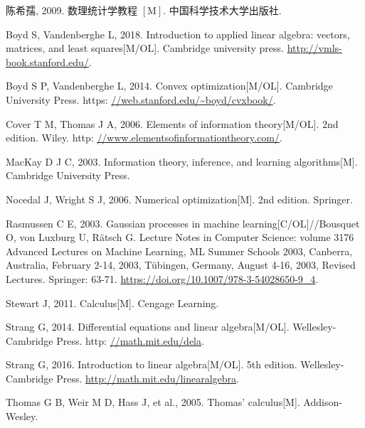 \documentclass[10pt]{article}
\begin{document}
陈希孺, 2009. 数理统计学教程 $[\mathrm{M}]$. 中国科学技术大学出版社.

Boyd S, Vandenberghe L, 2018. Introduction to applied linear algebra: vectors, matrices, and least squares[M/OL]. Cambridge university press. \href{http://vmls-book.stanford.edu/}{http://vmls-book.stanford.edu/}.

Boyd S P, Vandenberghe L, 2014. Convex optimization[M/OL]. Cambridge University Press. https: \href{//web.stanford.edu/%7Eboyd/cvxbook/}{//web.stanford.edu/\~{}boyd/cvxbook/}.

Cover T M, Thomas J A, 2006. Elements of information theory[M/OL]. 2nd edition. Wiley. http: \href{//www.elementsofinformationtheory.com/}{//www.elementsofinformationtheory.com/}.

MacKay D J C, 2003. Information theory, inference, and learning algorithms[M]. Cambridge University Press.

Nocedal J, Wright S J, 2006. Numerical optimization[M]. 2nd edition. Springer.

Rasmussen C E, 2003. Gaussian processes in machine learning[C/OL]//Bousquet O, von Luxburg U, Rätsch G. Lecture Notes in Computer Science: volume 3176 Advanced Lectures on Machine Learning, ML Summer Schools 2003, Canberra, Australia, February 2-14, 2003, Tübingen, Germany, August 4-16, 2003, Revised Lectures. Springer: 63-71. \href{https://doi.org/10.1007/978-3-54028650-9_4}{https://doi.org/10.1007/978-3-54028650-9\_4}.

Stewart J, 2011. Calculus[M]. Cengage Learning.

Strang G, 2014. Differential equations and linear algebra[M/OL]. Wellesley-Cambridge Press. http: \href{//math.mit.edu/dela}{//math.mit.edu/dela}.

Strang G, 2016. Introduction to linear algebra[M/OL]. 5th edition. Wellesley-Cambridge Press. \href{http://math.mit.edu/linearalgebra}{http://math.mit.edu/linearalgebra}.

Thomas G B, Weir M D, Hass J, et al., 2005. Thomas' calculus[M]. Addison-Wesley.
\end{document}
